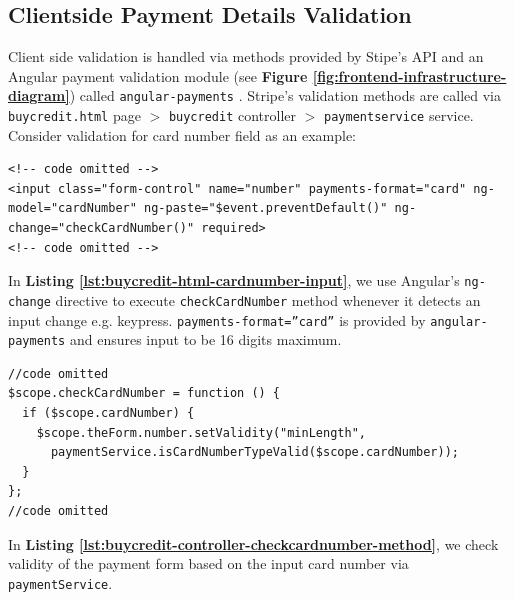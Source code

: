 \subsection{Clientside Payment Details Validation}
\label{subsec:clientside-payment-details-validation}

Client side validation is handled via methods provided by Stipe’s API and an Angular payment validation module  (see \textbf{Figure \ref{fig:frontend-infrastructure-diagram}}) called \texttt{angular-payments} \cite{angularpayments}. Stripe’s validation methods are called via \texttt{buycredit.html} page $>$ \texttt{buycredit} controller $>$ \texttt{paymentservice} service. Consider validation for card number field as an example:

\begin{listing}[H]
\begin{verbatim}
<!-- code omitted -->
<input class="form-control" name="number" payments-format="card" ng-model="cardNumber" ng-paste="$event.preventDefault()" ng-change="checkCardNumber()" required>
<!-- code omitted -->
\end{verbatim}
\label{lst:buycredit-html-cardnumber-input}
\end{listing}

In \textbf{Listing \ref{lst:buycredit-html-cardnumber-input}}, we  use Angular’s \texttt{ng-change} directive to execute \texttt{checkCardNumber} method whenever it detects an input change e.g. keypress. \texttt{payments-format=”card”} is provided by \texttt{angular-payments} and ensures input to be 16 digits maximum.\\

\begin{listing}[H]
\begin{verbatim}
//code omitted
$scope.checkCardNumber = function () {
  if ($scope.cardNumber) {
    $scope.theForm.number.setValidity("minLength",
      paymentService.isCardNumberTypeValid($scope.cardNumber));
  }
};
//code omitted
\end{verbatim}
\label{lst:buycredit-controller-checkcardnumber-method}
\end{listing}

In \textbf{Listing \ref{lst:buycredit-controller-checkcardnumber-method}}, we check validity of the payment form based on the input card number via \texttt{paymentService}.\\

